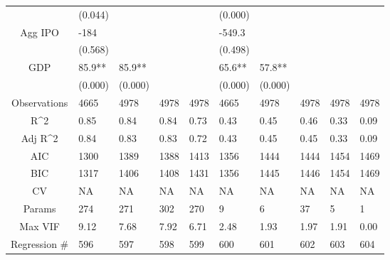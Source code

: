 \documentclass{article}
\begin{document}
\begin{table}[H]
\begin{tabular}{|clllllllll|}
   & (0.044) &  &  &  & (0.000) &  &  &  &  \\ 
  Agg IPO & -184 &  &  &  & -549.3 &  &  &  &  \\ 
   & (0.568) &  &  &  & (0.498) &  &  &  &  \\ 
  GDP & 85.9** & 85.9** &  &  & 65.6** & 57.8** &  &  &  \\ 
   & (0.000) & (0.000) &  &  & (0.000) & (0.000) &  &  &  \\ 
  \hline 
 Observations & 4665 & 4978 & 4978 & 4978 & 4665 & 4978 & 4978 & 4978 & 4978 \\ 
  R^2 & 0.85 & 0.84 & 0.84 & 0.73 & 0.43 & 0.45 & 0.46 & 0.33 & 0.09 \\ 
  Adj R^2 & 0.84 & 0.83 & 0.83 & 0.72 & 0.43 & 0.45 & 0.45 & 0.33 & 0.09 \\ 
  AIC & 1300 & 1389 & 1388 & 1413 & 1356 & 1444 & 1444 & 1454 & 1469 \\ 
  BIC & 1317 & 1406 & 1408 & 1431 & 1356 & 1445 & 1446 & 1454 & 1469 \\ 
  CV & NA & NA & NA & NA & NA & NA & NA & NA & NA \\ 
  Params & 274 & 271 & 302 & 270 & 9 & 6 & 37 & 5 & 1 \\ 
  Max VIF & 9.12 & 7.68 & 7.92 & 6.71 & 2.48 & 1.93 & 1.97 & 1.91 & 0.00 \\ 
  Regression \# & 596 & 597 & 598 & 599 & 600 & 601 & 602 & 603 & 604 \\ 
   \hline
\end{tabular}
 
\end{table}
\end{document}
